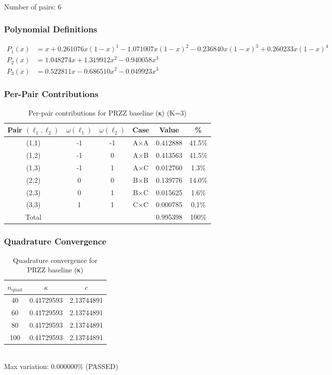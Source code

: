 Number of pairs: 6

\subsubsection{Polynomial Definitions}
\begin{align*}
P_1(x) &= x + 0.261076 x(1-x)^{1} - 1.071007 x(1-x)^{2} - 0.236840 x(1-x)^{3} + 0.260233 x(1-x)^{4} \\
P_2(x) &= 1.048274 x + 1.319912 x^{2} - 0.940058 x^{3} \\
P_3(x) &= 0.522811 x - 0.686510 x^{2} - 0.049923 x^{3}
\end{align*}

\subsubsection{Per-Pair Contributions}
\begin{table}[h]
\centering
\caption{Per-pair contributions for PRZZ baseline (κ) (K=3)}
\begin{tabular}{cccccc}
\hline
Pair $(\ell_1,\ell_2)$ & $\omega(\ell_1)$ & $\omega(\ell_2)$ & Case & Value & \% \\
\hline
(1,1) & -1 & -1 & A×A & 0.412888 & 41.5\% \\
(1,2) & -1 & 0 & A×B & 0.413563 & 41.5\% \\
(1,3) & -1 & 1 & A×C & 0.012760 & 1.3\% \\
(2,2) & 0 & 0 & B×B & 0.139776 & 14.0\% \\
(2,3) & 0 & 1 & B×C & 0.015625 & 1.6\% \\
(3,3) & 1 & 1 & C×C & 0.000785 & 0.1\% \\
\hline
Total & & & & 0.995398 & 100\% \\
\hline
\end{tabular}
\end{table}

\subsubsection{Quadrature Convergence}
\begin{table}[h]
\centering
\caption{Quadrature convergence for PRZZ baseline (κ)}
\begin{tabular}{ccc}
\hline
$n_{\text{quad}}$ & $\kappa$ & $c$ \\
\hline
40 & 0.41729593 & 2.13744891 \\
60 & 0.41729593 & 2.13744891 \\
80 & 0.41729593 & 2.13744891 \\
100 & 0.41729593 & 2.13744891 \\
\hline
\end{tabular}
\\Max variation: 0.000000\% (\checkmark PASSED)
\end{table}


